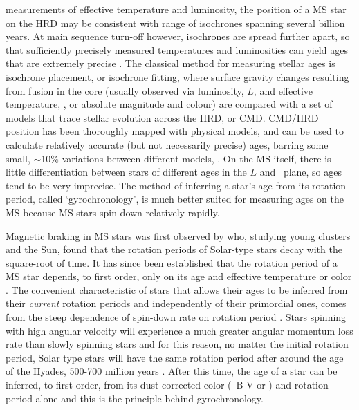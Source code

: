 measurements of effective temperature and luminosity, the position of a MS
star on the HRD may be consistent with range of isochrones spanning several
billion years.
At main sequence turn-off however, isochrones are spread further apart, so
that sufficiently precisely measured temperatures and luminosities can yield
ages that are extremely precise \citep[\eg][]{pont2004}.
The classical method for measuring stellar ages is isochrone placement, or
isochrone fitting, where surface gravity changes resulting from fusion in the
core (usually observed via luminosity, $L$, and effective temperature, \teff,
or absolute magnitude and colour) are compared with a set of models that trace
stellar evolution across the HRD, or CMD.
CMD/HRD position has been thoroughly mapped with physical models, and can be
used to calculate relatively accurate (but not necessarily precise) ages,
barring some small, $\sim$10\% variations between different models,
\citep[\eg][]{yi2001, dotter2008, dotter2016}.
On the MS itself, there is little differentiation between stars of different
ages in the $L$ and \teff\ plane, so ages tend to be very imprecise.
The method of inferring a star's age from its rotation period, called
`gyrochronology', is much better suited for measuring ages on the MS because
MS stars spin down relatively rapidly.

Magnetic braking in MS stars was first observed by \citet{skumanich1972} who,
studying young clusters and the Sun, found that the rotation periods of
Solar-type stars decay with the square-root of time.
It has since been established that the rotation period of a MS star depends,
to first order, only on its age and effective temperature or color
\citep[\eg][]{barnes2003}.
The convenient characteristic of stars that allows their ages to be inferred
from their {\it current} rotation periods and independently of their
primordial ones, comes from the steep dependence of spin-down rate on rotation
period \citep{kawaler1989}.
Stars spinning with high angular velocity will experience a much greater
angular momentum loss rate than slowly spinning stars and for this reason, no
matter the initial rotation period, Solar type stars will have the same
rotation period after around the age of the Hyades, 500-700 million years
\citep{irwin2009, gallet2015}.
After this time, the age of a star can be inferred, to first order, from its
dust-corrected color (\eg\ B-V or \gcolor) and rotation period alone and this
is the principle behind gyrochronology.

